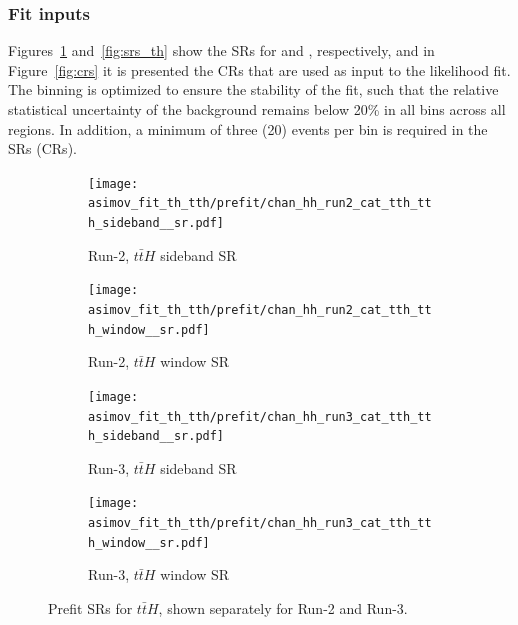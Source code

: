 \subsubsection*{Fit inputs}
Figures~\ref{fig:srs_tth} and~\ref{fig:srs_th} show the SRs for \ttH and \thqb, respectively, and in Figure~\ref{fig:crs} it is presented the CRs that are used as input to the likelihood fit. The binning is optimized to ensure the stability of the fit, such that the relative statistical uncertainty of the background remains below 20\% in all bins across all regions. In addition, a minimum of three (20) events per bin is required in the SRs (CRs).

\begin{figure}[htbp]
  \centering
  \begin{subfigure}[t]{0.45\textwidth}
    \centering
    \texttt{[image: asimov\_fit\_th\_tth/prefit/chan\_hh\_run2\_cat\_tth\_tth\_sideband\_\_sr.pdf]}
    \caption{Run-2, $t\bar{t}H$ sideband SR}
  \end{subfigure}
  \hfill
  \begin{subfigure}[t]{0.45\textwidth}
    \centering
    \texttt{[image: asimov\_fit\_th\_tth/prefit/chan\_hh\_run2\_cat\_tth\_tth\_window\_\_sr.pdf]}
    \caption{Run-2, $t\bar{t}H$ window SR}
  \end{subfigure}

  \vspace{0.4cm}
  \begin{subfigure}[t]{0.45\textwidth}
    \centering
    \texttt{[image: asimov\_fit\_th\_tth/prefit/chan\_hh\_run3\_cat\_tth\_tth\_sideband\_\_sr.pdf]}
    \caption{Run-3, $t\bar{t}H$ sideband SR}
  \end{subfigure}
  \hfill
  \begin{subfigure}[t]{0.45\textwidth}
    \centering
    \texttt{[image: asimov\_fit\_th\_tth/prefit/chan\_hh\_run3\_cat\_tth\_tth\_window\_\_sr.pdf]}
    \caption{Run-3, $t\bar{t}H$ window SR}
  \end{subfigure}

  \caption{Prefit SRs for $t\bar{t}H$, shown separately for Run-2 and Run-3.}
  \label{fig:srs_tth}
\end{figure}


